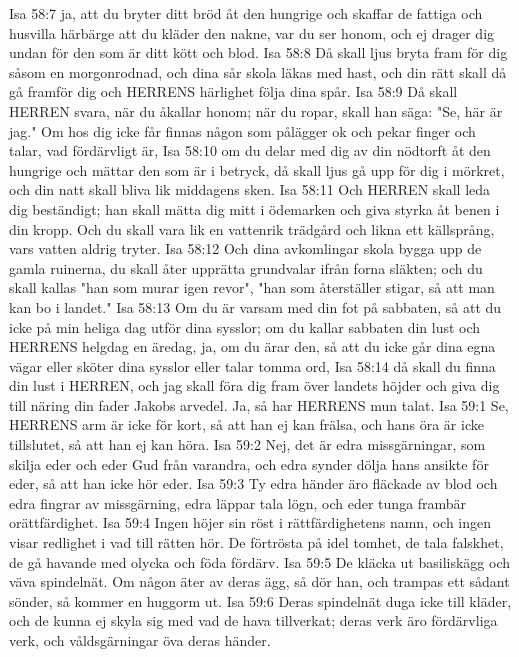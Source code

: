 Isa 58:7  ja, att du bryter ditt bröd åt den hungrige och skaffar de fattiga och husvilla härbärge att du kläder den nakne, var du ser honom, och ej drager dig undan för den som är ditt kött och blod.
Isa 58:8  Då skall ljus bryta fram för dig såsom en morgonrodnad, och dina sår skola läkas med hast, och din rätt skall då gå framför dig och HERRENS härlighet följa dina spår.
Isa 58:9  Då skall HERREN svara, när du åkallar honom; när du ropar, skall han säga: "Se, här är jag." Om hos dig icke får finnas någon som pålägger ok och pekar finger och talar, vad fördärvligt är,
Isa 58:10  om du delar med dig av din nödtorft åt den hungrige och mättar den som är i betryck, då skall ljus gå upp för dig i mörkret, och din natt skall bliva lik middagens sken.
Isa 58:11  Och HERREN skall leda dig beständigt; han skall mätta dig mitt i ödemarken och giva styrka åt benen i din kropp. Och du skall vara lik en vattenrik trädgård och likna ett källsprång, vars vatten aldrig tryter.
Isa 58:12  Och dina avkomlingar skola bygga upp de gamla ruinerna, du skall åter upprätta grundvalar ifrån forna släkten; och du skall kallas "han som murar igen revor", "han som återställer stigar, så att man kan bo i landet."
Isa 58:13  Om du är varsam med din fot på sabbaten, så att du icke på min heliga dag utför dina sysslor; om du kallar sabbaten din lust och HERRENS helgdag en äredag, ja, om du ärar den, så att du icke går dina egna vägar eller sköter dina sysslor eller talar tomma ord,
Isa 58:14  då skall du finna din lust i HERREN, och jag skall föra dig fram över landets höjder och giva dig till näring din fader Jakobs arvedel. Ja, så har HERRENS mun talat.
Isa 59:1  Se, HERRENS arm är icke för kort, så att han ej kan frälsa, och hans öra är icke tillslutet, så att han ej kan höra.
Isa 59:2  Nej, det är edra missgärningar, som skilja eder och eder Gud från varandra, och edra synder dölja hans ansikte för eder, så att han icke hör eder.
Isa 59:3  Ty edra händer äro fläckade av blod och edra fingrar av missgärning, edra läppar tala lögn, och eder tunga frambär orättfärdighet.
Isa 59:4  Ingen höjer sin röst i rättfärdighetens namn, och ingen visar redlighet i vad till rätten hör. De förtrösta på idel tomhet, de tala falskhet, de gå havande med olycka och föda fördärv.
Isa 59:5  De kläcka ut basiliskägg och väva spindelnät. Om någon äter av deras ägg, så dör han, och trampas ett sådant sönder, så kommer en huggorm ut.
Isa 59:6  Deras spindelnät duga icke till kläder, och de kunna ej skyla sig med vad de hava tillverkat; deras verk äro fördärvliga verk, och våldsgärningar öva deras händer.
